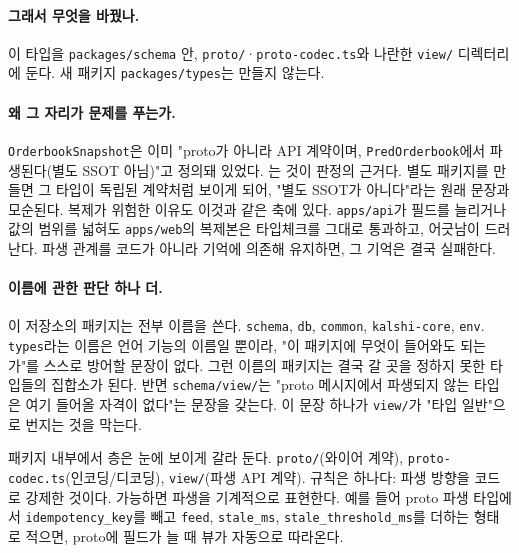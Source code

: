 \paragraph{그래서 무엇을 바꿨나.} 이 타입을 \texttt{packages/schema} 안,
\texttt{proto/}·\texttt{proto-codec.ts}와 나란한 \texttt{view/} 디렉터리에 둔다.
새 패키지 \texttt{packages/types}는 만들지 않는다.

\paragraph{왜 그 자리가 문제를 푸는가.} \texttt{OrderbookSnapshot}은 이미 "proto가
아니라 API 계약이며, \texttt{PredOrderbook}에서 파생된다(별도 SSOT 아님)"고 정의돼
있었다. 는 것이 판정의 근거다. 별도 패키지를
만들면 그 타입이 독립된 계약처럼 보이게 되어, "별도 SSOT가 아니다"라는 원래
문장과 모순된다. 복제가 위험한 이유도 이것과 같은 축에 있다. \texttt{apps/api}가
필드를 늘리거나 값의 범위를 넓혀도 \texttt{apps/web}의 복제본은 타입체크를 그대로
통과하고,  어긋남이 드러난다. 파생 관계를 코드가
아니라 기억에 의존해 유지하면, 그 기억은 결국 실패한다.

\paragraph{이름에 관한 판단 하나 더.} 이 저장소의 패키지는 전부  이름을
쓴다. \texttt{schema}, \texttt{db}, \texttt{common}, \texttt{kalshi-core},
\texttt{env}. \texttt{types}라는 이름은 언어 기능의 이름일 뿐이라, "이 패키지에
무엇이 들어와도 되는가"를 스스로 방어할 문장이 없다. 그런 이름의 패키지는 결국
갈 곳을 정하지 못한 타입들의 집합소가 된다. 반면 \texttt{schema/view/}는 "proto
메시지에서 파생되지 않는 타입은 여기 들어올 자격이 없다"는 문장을 갖는다. 이
문장 하나가 \texttt{view/}가 "타입 일반"으로 번지는 것을 막는다.

\begin{callout}
패키지 내부에서 층은 눈에 보이게 갈라 둔다. \texttt{proto/}(와이어 계약),
\texttt{proto-codec.ts}(인코딩/디코딩), \texttt{view/}(파생 API 계약). 규칙은
하나다:  파생
방향을 코드로 강제한 것이다. 가능하면 파생을 기계적으로 표현한다. 예를 들어
proto 파생 타입에서 \texttt{idempotency\_key}를 빼고 \texttt{feed},
\texttt{stale\_ms}, \texttt{stale\_threshold\_ms}를 더하는 형태로 적으면, proto에
필드가 늘 때 뷰가 자동으로 따라온다.
\end{callout}

